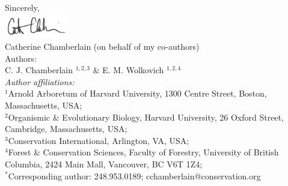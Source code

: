 \documentclass[11pt,a4paper]{article}\usepackage[]{graphicx}\usepackage[]{color}
\begin{document}
\vspace{1.5ex}
\noindent Sincerely, \\
\includegraphics[width=0.2\textwidth]{full_signature.jpg} \\
\noindent Catherine Chamberlain (on behalf of my co-authors)
\vspace{2ex}\\
\noindent Authors:\\
C. J. Chamberlain $^{1,2,3}$ \& E. M. Wolkovich $^{1,2,4}$
\vspace{2ex}\\
\emph{Author affiliations:}\\
$^{1}$Arnold Arboretum of Harvard University, 1300 Centre Street, Boston, Massachusetts, USA; \\
$^{2}$Organismic \& Evolutionary Biology, Harvard University, 26 Oxford Street, Cambridge, Massachusetts, USA; \\
$^{3}$Conservation International, Arlington, VA, USA;\\
$^{4}$Forest \& Conservation Sciences, Faculty of Forestry, University of British Columbia, 2424 Main Mall, Vancouver, BC V6T 1Z4;\\
\vspace{2ex}
$^*$Corresponding author: 248.953.0189; cchamberlain@conservation.org\\
\end{document}
